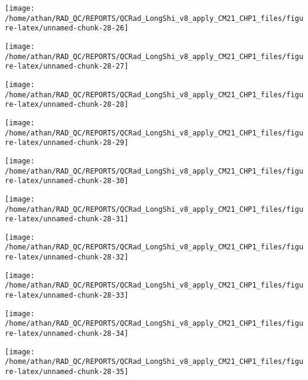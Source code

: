 \documentclass[
  10pt,
  a4paper,oneside]{article}
\begin{document}
\begin{center}\texttt{[image: /home/athan/RAD\_QC/REPORTS/QCRad\_LongShi\_v8\_apply\_CM21\_CHP1\_files/figure-latex/unnamed-chunk-28-26]} \end{center}

\begin{center}\texttt{[image: /home/athan/RAD\_QC/REPORTS/QCRad\_LongShi\_v8\_apply\_CM21\_CHP1\_files/figure-latex/unnamed-chunk-28-27]} \end{center}

\begin{center}\texttt{[image: /home/athan/RAD\_QC/REPORTS/QCRad\_LongShi\_v8\_apply\_CM21\_CHP1\_files/figure-latex/unnamed-chunk-28-28]} \end{center}

\begin{center}\texttt{[image: /home/athan/RAD\_QC/REPORTS/QCRad\_LongShi\_v8\_apply\_CM21\_CHP1\_files/figure-latex/unnamed-chunk-28-29]} \end{center}

\begin{center}\texttt{[image: /home/athan/RAD\_QC/REPORTS/QCRad\_LongShi\_v8\_apply\_CM21\_CHP1\_files/figure-latex/unnamed-chunk-28-30]} \end{center}

\begin{center}\texttt{[image: /home/athan/RAD\_QC/REPORTS/QCRad\_LongShi\_v8\_apply\_CM21\_CHP1\_files/figure-latex/unnamed-chunk-28-31]} \end{center}

\begin{center}\texttt{[image: /home/athan/RAD\_QC/REPORTS/QCRad\_LongShi\_v8\_apply\_CM21\_CHP1\_files/figure-latex/unnamed-chunk-28-32]} \end{center}

\begin{center}\texttt{[image: /home/athan/RAD\_QC/REPORTS/QCRad\_LongShi\_v8\_apply\_CM21\_CHP1\_files/figure-latex/unnamed-chunk-28-33]} \end{center}

\begin{center}\texttt{[image: /home/athan/RAD\_QC/REPORTS/QCRad\_LongShi\_v8\_apply\_CM21\_CHP1\_files/figure-latex/unnamed-chunk-28-34]} \end{center}

\begin{center}\texttt{[image: /home/athan/RAD\_QC/REPORTS/QCRad\_LongShi\_v8\_apply\_CM21\_CHP1\_files/figure-latex/unnamed-chunk-28-35]} \end{center}
\end{document}
